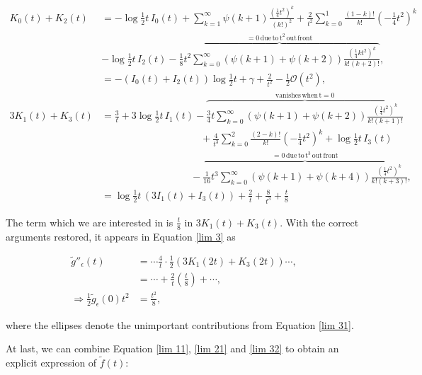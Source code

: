 \documentclass{article}
\numberwithin{equation}{section} %
\begin{document}
\begin{equation}
\begin{split}
K_0(t) + K_2(t) &= -\log \frac{1}{2}t \, I_0(t) + \sum_{k=1}^\infty \psi(k+1) \frac{(\frac{1}{4}t^2)^k}{(k!)^2} + \frac{2}{t^2}\sum_{k=0}^1 \frac{(1-k)!}{k!}(-\frac{1}{4}t^2)^k\\
& -\log\frac{1}{2}t \, I_2(t) - \overbrace{\frac{1}{8}t^2\sum_{k=0}^\infty (\psi(k+1) + \psi(k+2))\frac{(\frac{1}{4}kt^2)^k}{k!(k+2)!}}^{\mathrm{=0 \, due \, to \, t^2 \,out \, front}},\\
&= -(I_0(t) + I_2(t)) \log \frac{1}{2}t + \gamma + \frac{2}{t^2} - \frac{1}{2}  \mathcal{O}(t^2) ,\\
3K_1(t) + K_3(t) &= \frac{3}{t} + 3\log \frac{1}{2}t \, I_1(t) - \overbrace{\frac{3}{4}t \sum_{k=0}^\infty(\psi(k+1) + \psi(k+2)) \frac{(\frac{1}{4}t^2)^k}{k!(k+1)!}}^{\mathrm{vanishes \, when \, t=0}}\\
& \quad\quad\quad\quad\quad\quad\quad\quad\quad\quad + \frac{4}{t^3}\sum_{k=0}^2 \frac{(2-k)!}{k!}(-\frac{1}{4}t^2)^k + \log \frac{1}{2}t \, I_3(t) \\
& \quad\quad\quad\quad\quad\quad\quad\quad\quad-  \overbrace{\frac{1}{16}t^3 \sum_{k=0}^\infty (\psi(k+1) + \psi(k+4)) \frac{(\frac{1}{4}t^2)^k}{k!(k+3)!}}^{\mathrm{=0 \, due \, to \, t^3 \,out \, front}},\\
&=\log\frac{1}{2}t \, (3I_1(t) + I_3(t)) + \frac{2}{t} + \frac{8}{t^3} + \frac{t}{8}
\end{split}
\label{lim 31}
\end{equation}

\noindent The term which we are interested in is $\frac{t}{8}$ in $3K_1(t) + K_3(t)$. With the correct arguments restored, it appears in Equation \ref{lim 3} as 

\begin{equation}
\begin{split}
\tilde{g}''_\epsilon(t) &= \cdots \frac{4}{t}\cdot \frac{1}{2}(3K_1(2t) + K_3(2t)) \cdots ,\\
&= \cdots + \frac{2}{t} (\frac{t}{8}) + \cdots,\\
\Rightarrow \frac{1}{2}\tilde{g}_\epsilon(0)t^2 &= \frac{t^2}{8},
\end{split}
\label{lim 32}
\end{equation}

\noindent where the ellipses denote the unimportant contributions from Equation \ref{lim 31}.

At last, we can combine Equation \ref{lim 11}, \ref{lim 21} and \ref{lim 32} to obtain an explicit expression of $\tilde{f}(t)$:
\end{document}
